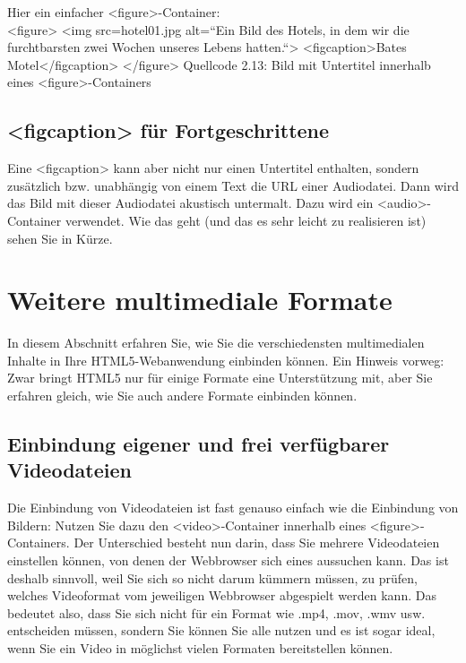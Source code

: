 Hier ein einfacher <figure>-Container:\\

<figure>
<img src=hotel01.jpg alt=“Ein Bild des Hotels, in dem wir die furchtbarsten zwei Wochen unseres Lebens hatten.“>
<figcaption>Bates Motel</figcaption>
</figure>
Quellcode 2.13: Bild mit Untertitel innerhalb eines <figure>-Containers

\subsection{<figcaption> für Fortgeschrittene}

Eine <figcaption> kann aber nicht nur einen Untertitel enthalten, sondern zusätzlich bzw. unabhängig von einem Text die URL einer Audiodatei. Dann wird das Bild mit dieser Audiodatei akustisch untermalt. Dazu wird ein <audio>-Container verwendet. Wie das geht (und das es sehr leicht zu realisieren ist) sehen Sie in Kürze.

\section{Weitere multimediale Formate}

In diesem Abschnitt erfahren Sie, wie Sie die verschiedensten multimedialen Inhalte in Ihre HTML5-Webanwendung einbinden können. Ein Hinweis vorweg: Zwar bringt HTML5 nur für einige Formate eine Unterstützung mit, aber Sie erfahren gleich, wie Sie auch andere Formate einbinden können.

\subsection{Einbindung eigener und frei verfügbarer Videodateien}

Die Einbindung von Videodateien ist fast genauso einfach wie die Einbindung von Bildern: Nutzen Sie dazu den <video>-Container innerhalb eines <figure>-Containers. Der Unterschied besteht nun darin, dass Sie mehrere Videodateien einstellen können, von denen der Webbrowser sich eines aussuchen kann. Das ist deshalb sinnvoll, weil Sie sich so nicht darum kümmern müssen, zu prüfen, welches Videoformat vom jeweiligen Webbrowser abgespielt werden kann. Das bedeutet also, dass Sie sich nicht für ein Format wie .mp4, .mov, .wmv usw. entscheiden müssen, sondern Sie können Sie alle nutzen und es ist sogar ideal, wenn Sie ein Video in möglichst vielen Formaten bereitstellen können.\\

